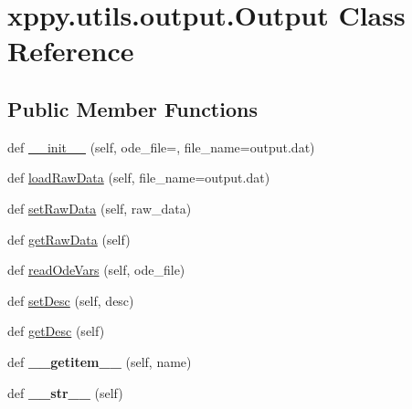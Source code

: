 \hypertarget{classxppy_1_1utils_1_1output_1_1_output}{}\section{xppy.\+utils.\+output.\+Output Class Reference}
\label{classxppy_1_1utils_1_1output_1_1_output}
\subsection*{Public Member Functions}
\begin{DoxyCompactItemize}
\item 
def \mbox{\hyperlink{classxppy_1_1utils_1_1output_1_1_output_a62d0df7e1f3a800edac050af678842c8}{\+\_\+\+\_\+init\+\_\+\+\_\+}} (self, ode\+\_\+file=\textquotesingle{}\textquotesingle{}, file\+\_\+name=\textquotesingle{}output.\+dat\textquotesingle{})
\item 
def \mbox{\hyperlink{classxppy_1_1utils_1_1output_1_1_output_a6df68d7a8ef5c845140d8471dff90eb5}{load\+Raw\+Data}} (self, file\+\_\+name=\textquotesingle{}output.\+dat\textquotesingle{})
\item 
def \mbox{\hyperlink{classxppy_1_1utils_1_1output_1_1_output_a7e7668fe3d38328b0e5f5011330dbe50}{set\+Raw\+Data}} (self, raw\+\_\+data)
\item 
def \mbox{\hyperlink{classxppy_1_1utils_1_1output_1_1_output_ac6f855dea97ca57cb5504b9aae1c79b0}{get\+Raw\+Data}} (self)
\item 
def \mbox{\hyperlink{classxppy_1_1utils_1_1output_1_1_output_a849eea0f7eef69c7a504601052a345b5}{read\+Ode\+Vars}} (self, ode\+\_\+file)
\item 
def \mbox{\hyperlink{classxppy_1_1utils_1_1output_1_1_output_ac458b3813bb3eff4460eadfc7857c157}{set\+Desc}} (self, desc)
\item 
def \mbox{\hyperlink{classxppy_1_1utils_1_1output_1_1_output_ae4d489fef048009ef3cd63832343f045}{get\+Desc}} (self)
\item 
\mbox{\label{classxppy_1_1utils_1_1output_1_1_output_a5309ac15aefcb158da6926cfff76a1e7}} 
def {\bfseries \+\_\+\+\_\+getitem\+\_\+\+\_\+} (self, name)
\item 
\mbox{\label{classxppy_1_1utils_1_1output_1_1_output_a04d921051364f32b24c79a1e7932cedf}} 
def {\bfseries \+\_\+\+\_\+str\+\_\+\+\_\+} (self)
\end{DoxyCompactItemize}
